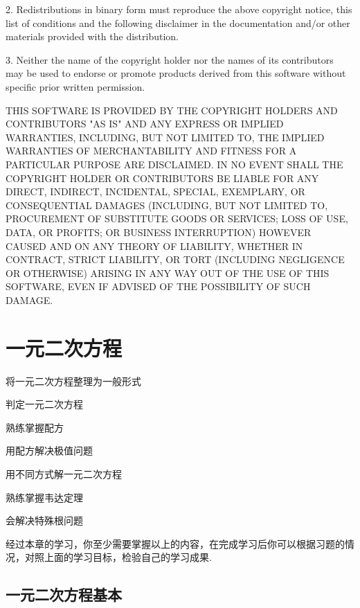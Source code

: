 \documentclass[lang=cn, 10pt, titlestyle=display, oneside]{elegantbook}
\begin{document}
2. Redistributions in binary form must reproduce the above copyright notice,
   this list of conditions and the following disclaimer in the documentation
   and/or other materials provided with the distribution.

3. Neither the name of the copyright holder nor the names of its
   contributors may be used to endorse or promote products derived from
   this software without specific prior written permission.

THIS SOFTWARE IS PROVIDED BY THE COPYRIGHT HOLDERS AND CONTRIBUTORS "AS IS"
AND ANY EXPRESS OR IMPLIED WARRANTIES, INCLUDING, BUT NOT LIMITED TO, THE
IMPLIED WARRANTIES OF MERCHANTABILITY AND FITNESS FOR A PARTICULAR PURPOSE ARE
DISCLAIMED. IN NO EVENT SHALL THE COPYRIGHT HOLDER OR CONTRIBUTORS BE LIABLE
FOR ANY DIRECT, INDIRECT, INCIDENTAL, SPECIAL, EXEMPLARY, OR CONSEQUENTIAL
DAMAGES (INCLUDING, BUT NOT LIMITED TO, PROCUREMENT OF SUBSTITUTE GOODS OR
SERVICES; LOSS OF USE, DATA, OR PROFITS; OR BUSINESS INTERRUPTION) HOWEVER
CAUSED AND ON ANY THEORY OF LIABILITY, WHETHER IN CONTRACT, STRICT LIABILITY,
OR TORT (INCLUDING NEGLIGENCE OR OTHERWISE) ARISING IN ANY WAY OUT OF THE USE
OF THIS SOFTWARE, EVEN IF ADVISED OF THE POSSIBILITY OF SUCH DAMAGE.

\tableofcontents



\chapter{一元二次方程}



\begin{introduction}

\item 将一元二次方程整理为一般形式
\item 判定一元二次方程
\item 熟练掌握配方
\item 用配方解决极值问题
\item 用不同方式解一元二次方程
\item 熟练掌握韦达定理
\item 会解决特殊根问题

\end{introduction}

经过本章的学习，你至少需要掌握以上的内容，在完成学习后你可以根据习题的情况，对照上面的学习目标，检验自己的学习成果.

\section{一元二次方程基本}
\end{document}
